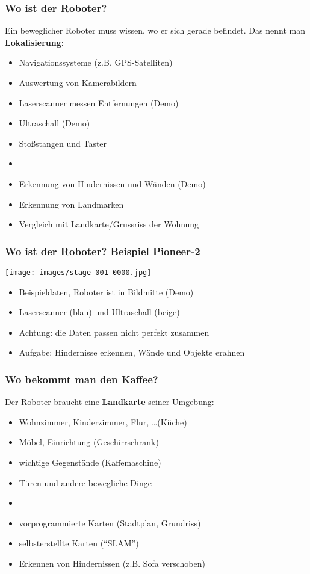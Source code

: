 \documentclass[t]{beamer}
\def\ii{\item[]}
\begin{document}
\begin{frame}
\frametitle{Wo ist der Roboter?}
Ein beweglicher Roboter muss wissen, wo er sich gerade befindet.
Das nennt man \textbf{Lokalisierung}:
\begin{itemize}
\item Navigationssysteme                        \hfill (z.B. GPS-Satelliten)
\item Auswertung von Kamerabildern 
\item Laserscanner messen Entfernungen                         \hfill (Demo)
\item Ultraschall                                              \hfill (Demo)
\item Stoßstangen und Taster
\ii
\item Erkennung von Hindernissen und Wänden                    \hfill (Demo)
\item Erkennung von Landmarken
\item Vergleich mit Landkarte/Grussriss der Wohnung
\end{itemize}
\end{frame}


\begin{frame}
\frametitle{Wo ist der Roboter? Beispiel Pioneer-2}
\texttt{[image: images/stage-001-0000.jpg]}
\begin{itemize}
\item Beispieldaten, Roboter ist in Bildmitte \hfill (Demo)
\item Laserscanner (blau) und Ultraschall (beige)
\item Achtung: die Daten passen nicht perfekt zusammen
\item Aufgabe: Hindernisse erkennen, Wände und Objekte erahnen
\end{itemize}
\end{frame}


\begin{frame}
\frametitle{Wo bekommt man den Kaffee?}
Der Roboter braucht eine \textbf{Landkarte} seiner Umgebung:
\begin{itemize}
\item Wohnzimmer, Kinderzimmer, Flur, \dots                 \hfill (Küche)
\item Möbel, Einrichtung                          \hfill (Geschirrschrank)    
\item wichtige Gegenstände                          \hfill (Kaffemaschine)
\item Türen und andere bewegliche Dinge
\ii
\end{itemize}
\begin{itemize}
\item vorprogrammierte Karten                \hfill (Stadtplan, Grundriss)
\item selbsterstellte Karten                             \hfill ("`SLAM"')
\item Erkennen von Hindernissen              \hfill (z.B. Sofa verschoben)
\end{itemize}
\end{frame}
\end{document}
